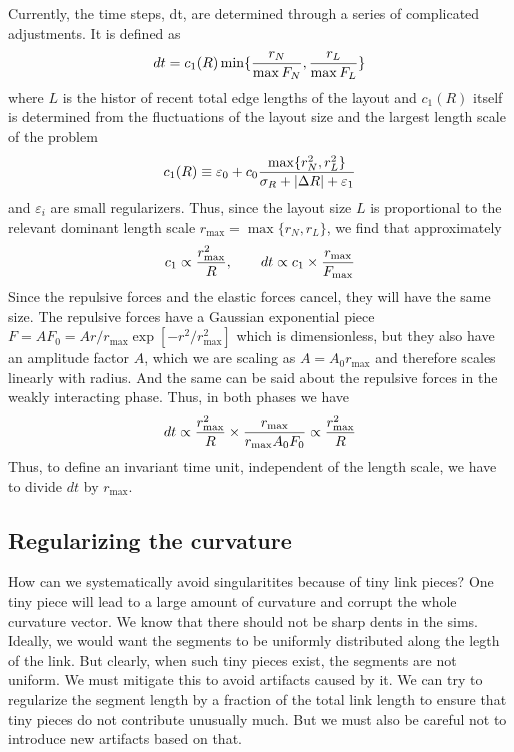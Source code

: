 \documentclass[nofootinbib,preprint,floatfix,titlepage,superscriptaddress]{revtex4} %
\begin{document}
Currently, the time steps, dt, are determined through a series of complicated adjustments. It is defined as 
$$dt = c_1( R) \min\{{r_N\over \max{F_N}},{r_L\over \max{F_L}}\} $$
where $L$ is the histor of recent total edge lengths of the layout and  $c_1(R)$ itself is determined from the fluctuations of the layout size and the largest length scale of the problem
$$ c_1(R) \equiv \varepsilon_0 + c_0 {\max\{r_N^2, r_L^2\}\over \sigma_R + |\Delta R|+\varepsilon_1}$$
and $\varepsilon_i$ are small regularizers. 
Thus, since the layout size $L$ is proportional to the relevant dominant length scale $r_{\max} = \max{\{r_N, r_L\}} $, we find that approximately
\[ c_1 \propto {r_{\max}^2\over R}, \qquad dt \propto c_1 \times {r_{\max} \over F_{\max}} \]
Since the repulsive forces and the elastic forces cancel, they will have the same size. The repulsive forces have a Gaussian exponential piece $ F = A F_0 = A r/r_{\max} \exp[-r^2/r^2_{\max}] $ which is dimensionless, but they also have an amplitude factor $A$, which we are scaling as $A = A_0 r_{\max}$ and therefore scales linearly with radius. And the same can be said about the repulsive forces in the weakly interacting phase. 
Thus, in both phases we have
$$ dt \propto {r_{\max}^2\over R} \times {r_{\max} \over r_{\max} A_0 F_0 } \propto {r_{\max}^2\over R} $$
Thus, to define an invariant time unit, independent of the length scale, we have to divide $dt$ by $r_{\max}$. 

\subsection{Regularizing the curvature}
How can we systematically avoid singularitites because of tiny link pieces? One tiny piece will lead to a large amount of curvature and corrupt the whole curvature vector. We know that there should not be sharp dents in the sims. Ideally, we would want the segments to be uniformly distributed along the legth of the link. But clearly, when such tiny pieces exist, the segments are not uniform. We must mitigate this to avoid artifacts caused by it. 
We can try to regularize the segment length by a fraction of the total link length to ensure that tiny pieces do not contribute unusually much. But we must also be careful not to introduce new artifacts based on that. 
\end{document}
